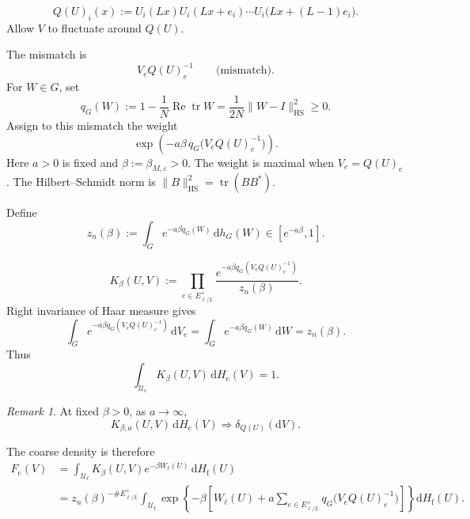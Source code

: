 \documentclass[10pt,reqno]{amsart}
\theoremstyle{definition}
\theoremstyle{remark}
\newtheorem{remark}[definition]{Remark}
\numberwithin{equation}{section}
\numberwithin{figure}{section}
\newcommand{\dd}{\mathrm d}
\newcommand{\e}{\varepsilon}
\newcommand{\Uf}{\mathcal U_{\mathrm f}}
\newcommand{\Uc}{\mathcal U_{\mathrm c}}
\newcommand{\Hf}{H_{\mathrm f}}
\newcommand{\Hc}{H_{\mathrm c}}
\newcommand{\Fc}{F_{\mathrm c}}
\DeclareMathOperator{\tr}{tr}
\begin{document}
\begin{equation}\label{eq:display-051}
Q(U)_i(x):=U_i(Lx)U_i(Lx+e_i)\cdots U_i\bigl(Lx+(L-1)e_i\bigr).
\end{equation}
Allow $V$ to fluctuate around $Q(U)$.

The mismatch is
\begin{equation}\label{eq:display-052}
V_eQ(U)_e^{-1}\qquad\text{(mismatch)}.
\end{equation}
For $W\in G$, set
\begin{equation}\label{eq:display-053}
q_G(W):=1-\frac1N\operatorname{Re}\tr W =\frac1{2N}\|W-I\|_{\mathrm{HS}}^2\ge0.
\end{equation}
Assign to this mismatch the weight
\begin{equation}\label{eq:display-054}
\exp\left(-a\beta\,q_G\bigl(V_eQ(U)_e^{-1}\bigr)\right).
\end{equation}
Here $a>0$ is fixed and $\beta:=\beta_{M,\e}>0$.
The weight is maximal when $V_e=Q(U)_e$. The Hilbert--Schmidt norm is $\|B\|_{\mathrm{HS}}^2=\tr(BB^*)$.

Define
\begin{equation}\label{eq:display-055}
z_n(\beta):=\int_Ge^{-a\beta q_G(W)}\,\dd h_G(W)\in[e^{-a\beta},1].
\end{equation}

\begin{equation}\label{eq:smooth-kernel}
K_\beta(U,V):=\prod_{e\in E_{\ell/L}^+}
\frac{e^{-a\beta q_G(V_eQ(U)_e^{-1})}}{z_n(\beta)}.
\end{equation}
Right invariance of Haar measure gives
\begin{equation}\label{eq:display-057}
\int_Ge^{-a\beta q_G(V_eQ(U)_e^{-1})}\,\dd V_e
=\int_Ge^{-a\beta q_G(W)}\,\dd W =z_n(\beta).
\end{equation}
Thus
\begin{equation}\label{eq:display-058}
\int_{\Uc}K_\beta(U,V)\,\dd\Hc(V)=1.
\end{equation}
\begin{remark} At fixed $\beta>0$, as $a\to\infty$,
\begin{equation}\label{eq:display-059}
K_{\beta,a}(U,V)\,\dd\Hc(V)\Longrightarrow\delta_{Q(U)}(\dd V).
\end{equation}
\end{remark}

The coarse density is therefore
\begin{equation}\label{eq:display-060}
\begin{aligned}
\Fc(V)
&=\int_{\mathcal U_\ell}K_\beta(U,V)e^{-\beta W_\ell(U)}\,\dd\Hf(U)\\
&=z_n(\beta)^{-\#E_{\ell/L}^+}\int_{\Uf}
\exp\left\{-\beta\left[W_\ell(U)
+a\sum_{e\in E_{\ell/L}^+}q_G\bigl(V_eQ(U)_e^{-1}\bigr)\right]\right\}
\dd\Hf(U).
\end{aligned}
\end{equation}
\end{document}
